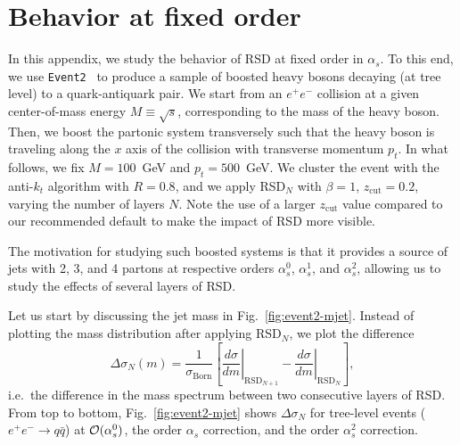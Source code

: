 \documentclass[11pt,a4paper]{article}
\newcommand{\as}{\alpha_s}
\DeclareRobustCommand{\Fig}[1]{Fig.~\ref{#1}}
\begin{document}
\appendix



\section{Behavior at fixed order} \label{sec:fixed_order}

In this appendix, we study the behavior of RSD at fixed order in $\as$.
%
To this end, we use \texttt{Event2}~\cite{Catani:1996jh,Catani:1996vz}
to produce a sample of boosted heavy bosons decaying (at tree level)
to a quark-antiquark pair.
%
We start from an $e^+e^-$ collision at a given center-of-mass energy
$M\equiv\sqrt{s}$, corresponding to the mass of the heavy boson.
%
Then, we boost the partonic system transversely such that the heavy boson is traveling along the $x$ axis of the collision with transverse momentum $p_t$.
%
In what follows, we fix $M=100$~GeV and $p_t=500$~GeV.
%
We cluster the event with the anti-$k_t$ algorithm with
$R=0.8$, and we apply RSD$_N$ with $\beta=1$, $z_{\text{cut}}=0.2$,
varying the number of layers $N$.
%
Note the use of a larger $z_{\text{cut}}$ value compared to our recommended default to make the impact of RSD more visible.


The motivation for studying such boosted systems is that it provides a
source of jets with 2, 3, and 4 partons at respective orders
$\alpha_s^0$, $\alpha_s^1$, and $\alpha_s^2$, allowing us to study
the effects of several layers of RSD.

Let us start by discussing the jet mass in \Fig{fig:event2-mjet}. 
%
Instead of plotting the mass distribution after applying RSD$_N$, we
plot the difference
\begin{equation}
\label{eq:massdifference}
  \Delta \sigma_N(m) = \frac{1}{\sigma_{\text{Born}}}\left[
    \left.\frac{d\sigma}{dm}\right|_{\text{RSD}_{N+1}} -
    \left.\frac{d\sigma}{dm}\right|_{\text{RSD}_N} \right],
\end{equation}
i.e.\ the difference in the mass spectrum between two consecutive
layers of RSD.
%
From top to bottom, \Fig{fig:event2-mjet} shows $\Delta\sigma_N$ for tree-level
events ($e^+e^-\to q\bar q$) at ${\cal{O}}(\alpha_s^0)$, the order $\alpha_s$ correction, and the order $\alpha_s^2$ correction.
\end{document}
